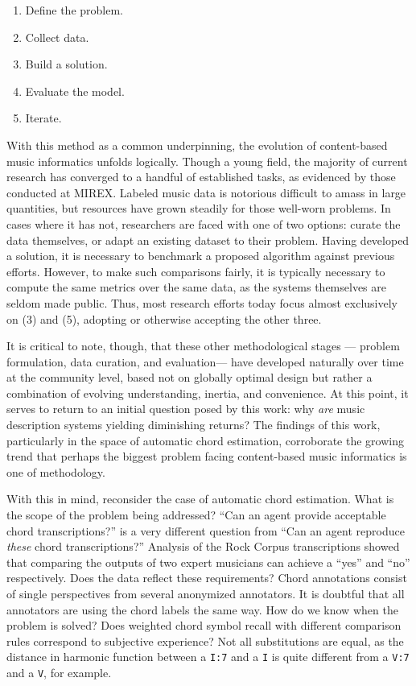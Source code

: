 \begin{enumerate}
\item Define the problem.
\item Collect data.
\item Build a solution.
\item Evaluate the model.
\item Iterate.
\end{enumerate}

With this method as a common underpinning, the evolution of content-based music informatics unfolds logically.
Though a young field, the majority of current research has converged to a handful of established tasks, as evidenced by those conducted at MIREX.
Labeled music data is notorious difficult to amass in large quantities, but resources have grown steadily for those well-worn problems.
In cases where it has not, researchers are faced with one of two options:
curate the data themselves, or adapt an existing dataset to their problem.
Having developed a solution, it is necessary to benchmark a proposed algorithm against previous efforts.
However, to make such comparisons fairly, it is typically necessary to compute the same metrics over the same data, as the systems themselves are seldom made public.
Thus, most research efforts today focus almost exclusively on (3) and (5), adopting or otherwise accepting the other three.

It is critical to note, though, that these other methodological stages --- problem formulation, data curation, and evaluation--- have developed naturally over time at the community level, based not on globally optimal design but rather a combination of evolving understanding, inertia, and convenience.
At this point, it serves to return to an initial question posed by this work:
why \emph{are} music description systems yielding diminishing returns?
The findings of this work, particularly in the space of automatic chord estimation, corroborate the growing trend that perhaps the biggest problem facing content-based music informatics is one of methodology.

With this in mind, reconsider the case of automatic chord estimation.
What is the scope of the problem being addressed?
``Can an agent provide acceptable chord transcriptions?'' is a very different question from ``Can an agent reproduce \emph{these} chord transcriptions?''
Analysis of the Rock Corpus transcriptions showed that comparing the outputs of two expert musicians can achieve a ``yes'' and ``no'' respectively.
Does the data reflect these requirements?
Chord annotations consist of single perspectives from several anonymized annotators.
It is doubtful that all annotators are using the chord labels the same way.
How do we know when the problem is solved?
Does weighted chord symbol recall with different comparison rules correspond to subjective experience?
Not all substitutions are equal, as the distance in harmonic function between a \texttt{I:7} and a \texttt{I} is quite different from a \texttt{V:7} and a \texttt{V}, for example.

